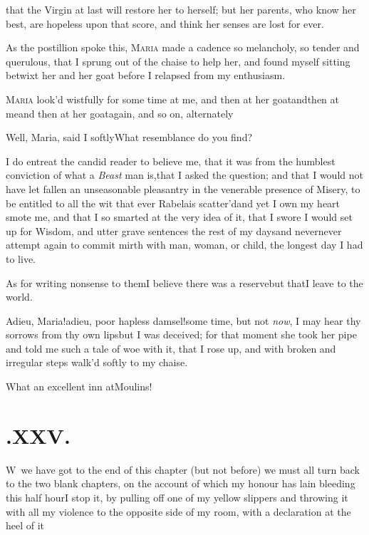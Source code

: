 \documentclass{article}
\begin{document}
\noindent
{}
\pb
that the Virgin at last will restore her to herself; but her parents, who know her
best, are hopeless upon that score, and think her senses are lost for ever.

As the postillion spoke this, \textsc{Maria} made a
cadence so melancholy, so tender and querulous, that I sprung out
of the chaise to help her, and found myself sitting betwixt
her and her goat before I relapsed from my enthusiasm.

\textsc{Maria} look’d wistfully for some time at me,
and then at her goat\tsh and\break then at me\tsh and
then at her goat\break again, and so on, alternately\tsh

\tsh Well, Maria, said I
softly\tsh What resemblance do you find?

\newpage
I do entreat the candid reader to believe me, that it was from
the humblest conviction of what a \textit{Beast} man
is,\tsh that I asked the question; and that I would not
have let fallen an unseasonable pleasantry in the venerable
presence of Misery, to be entitled to all the wit that ever
Rabelais scatter’d\tsh and yet I own my heart
smote me, and that I so smarted at the very idea of it, that I
swore I would set up for Wisdom, and utter grave sentences the rest
of my days\tsh and never\tsh never attempt again
to commit mirth with man, woman, or child, the longest day I had to
live.

As for writing nonsense to them\tsh\break I believe there was
a reserve\tsk but that\break I leave to the world.

\newpage
Adieu, Maria!\tsk adieu, poor hapless
damsel!\tsh some time, but not \textit{now}, I may hear thy sorrows
from thy own lips\break\tsh but I was deceived; for that moment
she took her pipe and told me such a tale of woe with it, that I
rose up, and with broken and irregular steps walk’d softly to
my chaise.

\tsh What an excellent inn at\break Moulins!


\newpage
\section{.\enspace XXV.}

\lettrine{W}{\,} we have got to the end of this
chapter (but not before) we must all turn back to the two blank
chapters, on the account of which my honour has lain bleeding this
half hour\tsh I stop it, by pulling off one of my yellow
slippers and throwing it with all my violence to the opposite side
of my room, with a declaration at the heel of it\tsh
\end{document}
